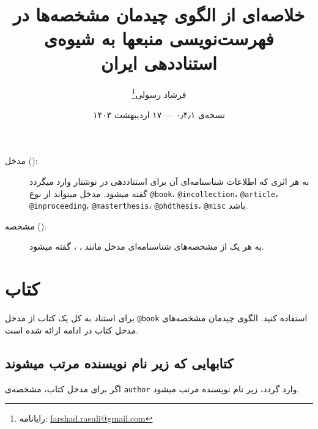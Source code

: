 \documentclass[a4paper,11pt]{article}
\begin{document}
\title{خلاصه‌ای از الگوی چیدمان مشخصه‌ها در فهرست‌نویسی منبعها به شیوه‌ی استناددهی ایران}
\author{فرشاد رسولی\thanks{رایانامه: \url{farshad.rasuli@gmail.com}}}
\date{نسخه‌ی ۰٫۴٫۱ --- ۱۷ اردیبهشت ۱۴۰۳}
\maketitle


\begin{description}
\item[مدخل ():]
به هر اثری که اطلاعات شناسنامه‌ای آن برای استناددهی  در نوشتار وارد میگردد گفته میشود. مدخل میتواند از نوع \verb|@book|، \verb|@incollection|، \verb|@article|، \verb|@inproceeding|، \verb|@masterthesis|، \verb|@phdthesis|، \verb|@misc| باشد.
\item[مشخصه ():]
به هر یک از مشخصه‌های شناسنامه‌ای مدخل مانند ، ،  گفته میشود.
\end{description}



\renewcommand{\contentsname}{فهرست}
\tableofcontents










\section{کتاب}
برای استناد به کل یک کتاب از مدخل \verb|@book| استفاده کنید. الگوی چیدمان مشخصه‌های مدخل کتاب در ادامه ارائه شده است.





\subsection{کتابهایی که زیر نام نویسنده مرتب میشوند}
اگر برای مدخل کتاب، مشخصه‌ی \verb|author| وارد گردد، زیر نام نویسنده مرتب میشود.
\end{document}
